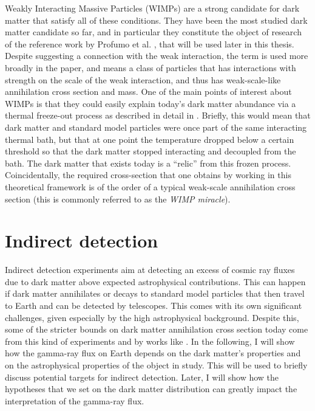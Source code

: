 Weakly Interacting Massive Particles (WIMPs) are a strong candidate for dark matter that satisfy all of these conditions. They have been the most studied dark matter candidate so far, and in particular they constitute the object of research of the reference work by Profumo et al. \cite{Profumo_2018}, that will be used later in this thesis.
Despite suggesting a connection with the weak interaction, the term is used more broadly in the paper, and means a class of particles that has interactions with strength on the scale of the weak interaction, and thus has weak-scale-like annihilation cross section and mass. One of the main points of interest about WIMPs is that they could easily explain today's dark matter abundance via a thermal freeze-out process as described in detail in \cite[Chapter 4]{Cirelli_2024}. Briefly, this would mean that dark matter and standard model particles were once part of the same interacting thermal bath, but that at one point the temperature dropped below a certain threshold so that the dark matter stopped interacting and decoupled from the bath. The dark matter that exists today is a ``relic'' from this frozen process. Coincidentally, the required cross-section that one obtains by working in this theoretical framework is of the order of a typical weak-scale annihilation cross section (this is commonly referred to as the \emph{WIMP miracle}).

\section{Indirect detection}\label{sec:indirect_detection}
Indirect detection experiments aim at detecting an excess of cosmic ray fluxes due to dark matter above expected astrophysical contributions. This can happen if dark matter annihilates or decays to standard model particles that then travel to Earth and can be detected by telescopes. This comes with its own significant challenges, given especially by the high astrophysical background. Despite this, some of the stricter bounds on dark matter annihilation cross section today \cite{Hooper_2018} come from this kind of experiments and by works like \cite{Profumo_2018}. In the following, I will show how the gamma-ray flux on Earth depends on the dark matter's properties and on the astrophysical properties of the object in study. This will be used to briefly discuss potential targets for indirect detection. Later, I will show how the hypotheses that we set on the dark matter distribution can greatly impact the interpretation of the gamma-ray flux.

